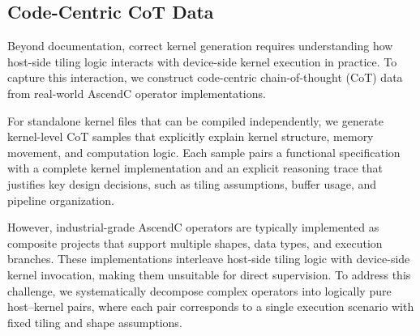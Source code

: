 \subsection{Code-Centric CoT Data}
\label{kernel_dataset}

Beyond documentation, correct kernel generation requires understanding how host-side tiling logic interacts with device-side kernel execution in practice. To capture this interaction, we construct code-centric chain-of-thought (CoT) data from real-world AscendC operator implementations.

For standalone kernel files that can be compiled independently, we generate kernel-level CoT samples that explicitly explain kernel structure, memory movement, and computation logic. Each sample pairs a functional specification with a complete kernel implementation and an explicit reasoning trace that justifies key design decisions, such as tiling assumptions, buffer usage, and pipeline organization.

However, industrial-grade AscendC operators are typically implemented as composite projects that support multiple shapes, data types, and execution branches. These implementations interleave host-side tiling logic with device-side kernel invocation, making them unsuitable for direct supervision. To address this challenge, we systematically decompose complex operators into logically pure host--kernel pairs, where each pair corresponds to a single execution scenario with fixed tiling and shape assumptions.

